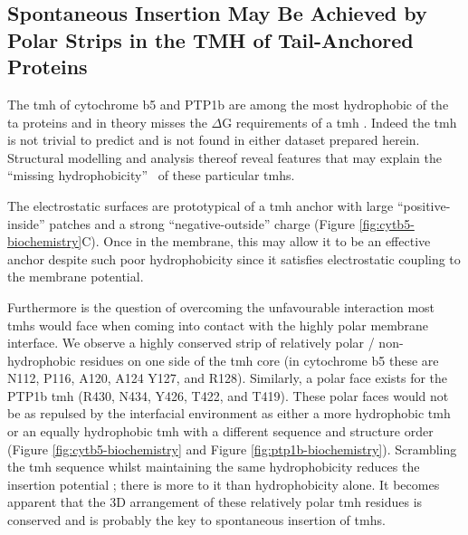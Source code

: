 \subsection{Spontaneous Insertion May Be Achieved by Polar Strips in the TMH of Tail-Anchored Proteins}

The \gls{tmh} of cytochrome b5 and PTP1b are among the most hydrophobic of the \gls{ta} proteins and in theory misses the $\Delta$G requirements of a \gls{tmh} \cite{Rabu2008, Rabu2009}.
Indeed the \gls{tmh} is not trivial to predict and is not found in either dataset prepared herein.
Structural modelling and analysis thereof reveal features that may explain the ``missing hydrophobicity''~\cite{Hessa2005, Hedin2010, Hessa2007, Ojemalm2012} of these particular \gls{tmh}s.

The electrostatic surfaces are prototypical of a \gls{tmh} anchor with large ``positive\--inside'' patches \cite{VonHeijne1989, Andersson1992, Sharpe2010, Baeza-Delgado2013, Pogozheva2013, Baker2017} and a strong ``negative\--outside'' charge \cite{Baker2017}(Figure \ref{fig:cytb5-biochemistry}C).
Once in the membrane, this may allow it to be an effective anchor despite such poor hydrophobicity since it satisfies electrostatic coupling to the membrane potential.

Furthermore is the question of overcoming the unfavourable interaction most \gls{tmh}s would face when coming into contact with the highly polar membrane interface.
We observe a highly conserved strip of relatively polar / non-hydrophobic residues on one side of the \gls{tmh} core (in cytochrome b5 these are N112, P116, A120, A124 Y127, and R128).
Similarly, a polar face exists for the PTP1b \gls{tmh} (R430, N434, Y426, T422, and T419).
These polar faces would not be as repulsed by the interfacial environment as either a more hydrophobic \gls{tmh} or an equally hydrophobic \gls{tmh} with a different sequence and structure order (Figure \ref{fig:cytb5-biochemistry} and Figure \ref{fig:ptp1b-biochemistry}).
Scrambling the \gls{tmh} sequence whilst maintaining the same hydrophobicity reduces the insertion potential \cite{Brambillasca2006}; there is more to it than hydrophobicity alone.
It becomes apparent that the 3D arrangement of these relatively polar \gls{tmh} residues is conserved and is probably the key to spontaneous insertion of \gls{tmh}s.

